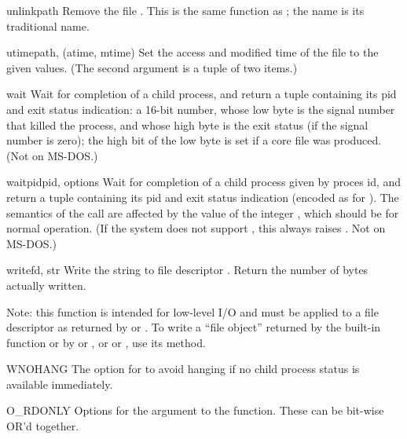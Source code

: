 \begin{funcdesc}{unlink}{path}
Remove the file .  This is the same function as ;
the  name is its traditional \UNIX{} name.
\end{funcdesc}

\begin{funcdesc}{utime}{path, {\rm (}atime, mtime{\rm )}}
Set the access and modified time of the file to the given values.
(The second argument is a tuple of two items.)
\end{funcdesc}

\begin{funcdesc}{wait}{}
Wait for completion of a child process, and return a tuple containing
its pid and exit status indication: a 16-bit number, whose low byte is
the signal number that killed the process, and whose high byte is the
exit status (if the signal number is zero); the high bit of the low
byte is set if a core file was produced.  (Not on MS-DOS.)
\end{funcdesc}

\begin{funcdesc}{waitpid}{pid, options}
Wait for completion of a child process given by proces id, and return
a tuple containing its pid and exit status indication (encoded as for
).  The semantics of the call are affected by the
value of the integer , which should be  for
normal operation.  (If the system does not support
, this always raises .  Not on
MS-DOS.)
\end{funcdesc}

\begin{funcdesc}{write}{fd, str}
Write the string  to file descriptor .
Return the number of bytes actually written.

Note: this function is intended for low-level I/O and must be applied
to a file descriptor as returned by  or
.  To write a ``file object'' returned by the
built-in function  or by  or
, or  or , use
its  method.
\end{funcdesc}

\begin{datadesc}{WNOHANG}
The option for  to avoid hanging if no child
process status is available immediately.
\end{datadesc}


\begin{datadesc}{O_RDONLY}
Options for the  argument to the  function.
These can be bit-wise OR'd together.
\end{datadesc}
